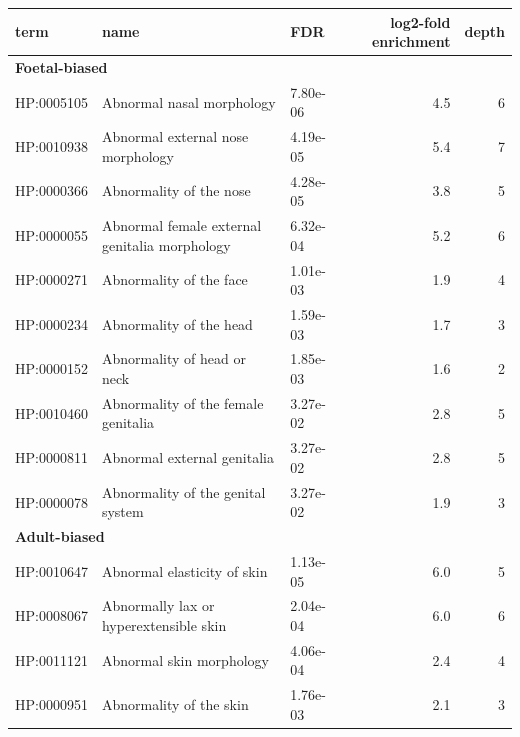 \documentclass[
]{article}
\begin{document}
\begin{table}
{\begin{tabular}[t]{l|l|l|r|r}
\hline
term & name & FDR & log2-fold enrichment & depth\\
\hline
\multicolumn{5}{l}{\textbf{Foetal-biased}}\\
\hline
\hspace{1em}HP:0005105 & Abnormal nasal morphology & 7.80e-06 & 4.5 & 6\\
\hline
\hspace{1em}HP:0010938 & Abnormal external nose morphology & 4.19e-05 & 5.4 & 7\\
\hline
\hspace{1em}HP:0000366 & Abnormality of the nose & 4.28e-05 & 3.8 & 5\\
\hline
\hspace{1em}HP:0000055 & Abnormal female external genitalia morphology & 6.32e-04 & 5.2 & 6\\
\hline
\hspace{1em}HP:0000271 & Abnormality of the face & 1.01e-03 & 1.9 & 4\\
\hline
\hspace{1em}HP:0000234 & Abnormality of the head & 1.59e-03 & 1.7 & 3\\
\hline
\hspace{1em}HP:0000152 & Abnormality of head or neck & 1.85e-03 & 1.6 & 2\\
\hline
\hspace{1em}HP:0010460 & Abnormality of the female genitalia & 3.27e-02 & 2.8 & 5\\
\hline
\hspace{1em}HP:0000811 & Abnormal external genitalia & 3.27e-02 & 2.8 & 5\\
\hline
\hspace{1em}HP:0000078 & Abnormality of the genital system & 3.27e-02 & 1.9 & 3\\
\hline
\multicolumn{5}{l}{\textbf{Adult-biased}}\\
\hline
\hspace{1em}HP:0010647 & Abnormal elasticity of skin & 1.13e-05 & 6.0 & 5\\
\hline
\hspace{1em}HP:0008067 & Abnormally lax or hyperextensible skin & 2.04e-04 & 6.0 & 6\\
\hline
\hspace{1em}HP:0011121 & Abnormal skin morphology & 4.06e-04 & 2.4 & 4\\
\hline
\hspace{1em}HP:0000951 & Abnormality of the skin & 1.76e-03 & 2.1 & 3\\

\end{tabular}}
\end{table}
\end{document}
